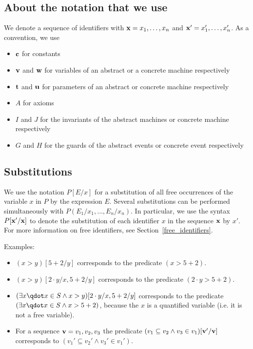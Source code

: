 \subsection{About the notation that we use}
\label{about_the_notation}

We denote a sequence of identifiers with $\mathbf{x} = x_1,\ldots,x_n$ and $\mathbf{x}' = x'_1,\ldots,x'_n$.
As a convention, we use
\begin{itemize}
\item $\mathbf{c}$ for constants
\item $\mathbf{v}$ and $\mathbf{w}$ for variables of an abstract or a concrete machine respectively
\item $\mathbf{t}$ and $\mathbf{u}$ for parameters of an abstract or concrete machine respectively
\item $A$ for axioms
\item $I$ and $J$ for the invariants of the abstract machines or concrete machine respectively
\item $G$ and $H$ for the guards of the abstract events or concrete event respectively
\end{itemize}

\subsection{Substitutions}
We use the notation $P[E/x]$ for a substitution of all free occurrences of the variable $x$ in
$P$ by the expression $E$.
Several substitutions can be performed simultaneously with $P(E_1/x_1,\ldots,E_n/x_n)$.
In particular, we use the syntax $P[\mathbf{x}'/\mathbf{x}]$ to denote the substitution of
each identifier $x$ in the sequence $\mathbf{x}$ by $x'$.
For more information on free identifiers, see Section~\ref{free_identifiers}.

Examples:
\begin{itemize}
\item $(x>y)[5+2/y]$ corresponds to the predicate $(x>5+2)$.
\item $(x>y)[2\cdot y/x,5+2/y]$ corresponds to the predicate $(2\cdot y>5+2)$.
\item $(\exists x \qdot x\in S \land x>y)[2\cdot y/x,5+2/y]$ corresponds to the predicate
  $(\exists x \qdot x\in S \land x>5+2)$, because the $x$ is a quantified variable 
  (i.e. it is not a free variable).
\item For a sequence $\mathbf{v}=v_1,v_2,v_3$ the predicate 
  $(v_1\subseteq v_2\land v_3\in v_1)[\mathbf{v}'/\mathbf{v}]$  corresponds to
  $(v_1'\subseteq v_2'\land v_3'\in v_1')$.
\end{itemize}


